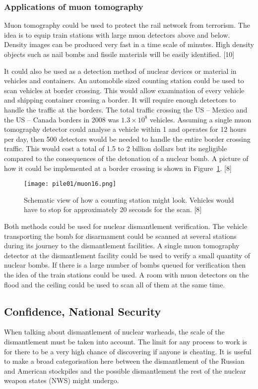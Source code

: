 \documentclass[twocolumn,a4paper]{article}
\begin{document}
\subsubsection{Applications of muon tomography}
Muon tomography could be used to protect the rail network from
terrorism. The idea is to equip train stations with large muon
detectors above and below. Density images can be produced very fast in
a time scale of minutes. High density objects such as nail bombs and
fissile materials will be easily identified. [10]

It could also be used as a detection method of nuclear devices or
material in vehicles and containers.  An automobile sized counting
station could be used to scan vehicles at border crossing. This would
allow examination of every vehicle and shipping container crossing a
border. It will require enough detectors to handle the traffic at the
borders. The total traffic crossing the US -- Mexico and the US --
Canada borders in 2008 was \(1.3\times10^8\) vehicles. Assuming a
single muon tomography detector could analyse a vehicle within
\unit{1}{\minute} and operates for 12 hours per day, then 500
detectors would be needed to handle the entire border crossing
traffic. This would cost a total of 1.5 to 2 billion dollars but its
negligible compared to the consequences of the detonation of a nuclear
bomb. A picture of how it could be implemented at a border crossing is
shown in Figure~\ref{fig:muon16}. [8]

\begin{figure}
  \texttt{[image: pile01/muon16.png]}
  \caption{Schematic view of how a counting station might
    look. Vehicles would have to stop for approximately 20 seconds for
    the scan. [8]}
  \label{fig:muon16}
\end{figure}

Both methods could be used for nuclear dismantlement verification. The
vehicle transporting the bomb for disarmament could be scanned at
several stations during its journey to the dismantlement facilities. A
single muon tomography detector at the dismantlement facility could be
used to verify a small quantity of nuclear bombs. If there is a large
number of bombs queued for verification then the idea of the train
stations could be used. A room with muon detectors on the flood and
the ceiling could be used to scan all of them at the same time.

\subsection{Confidence, National Security}
When talking about dismantlement of nuclear warheads, the scale of the 
dismantlement must be taken into account. The limit for any process to
work is for there to be a very high chance of discovering if anyone is 
cheating. It is useful to make a broad categorisation here between the
dismantlement of the Russian and American stockpiles and the possible 
dismantlement the rest of the nuclear weapon states (NWS) might undergo.
\end{document}
